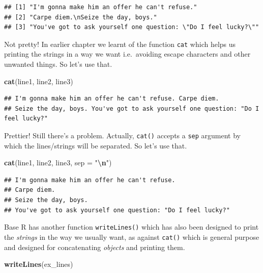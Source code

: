 \documentclass[
]{book}
\newenvironment{Shaded}{\begin{snugshade}}{\end{snugshade}}
\newcommand{\AttributeTok}[1]{\textcolor[rgb]{0.13,0.29,0.53}{#1}}
\newcommand{\FunctionTok}[1]{\textcolor[rgb]{0.13,0.29,0.53}{\textbf{#1}}}
\newcommand{\NormalTok}[1]{#1}
\newcommand{\SpecialCharTok}[1]{\textcolor[rgb]{0.81,0.36,0.00}{\textbf{#1}}}
\newcommand{\StringTok}[1]{\textcolor[rgb]{0.31,0.60,0.02}{#1}}
\begin{document}
\begin{verbatim}
## [1] "I'm gonna make him an offer he can't refuse."                 
## [2] "Carpe diem.\nSeize the day, boys."                            
## [3] "You've got to ask yourself one question: \"Do I feel lucky?\""
\end{verbatim}

Not pretty! In earlier chapter we learnt of the function \texttt{cat} which helps us printing the strings in a way we want i.e.~avoiding escape characters and other unwanted things. So let's use that.

\begin{Shaded}
\begin{Highlighting}[]
\FunctionTok{cat}\NormalTok{(line1, line2, line3)}
\end{Highlighting}
\end{Shaded}

\begin{verbatim}
## I'm gonna make him an offer he can't refuse. Carpe diem.
## Seize the day, boys. You've got to ask yourself one question: "Do I feel lucky?"
\end{verbatim}

Prettier! Still there's a problem. Actually, \texttt{cat()} accepts a \texttt{sep} argument by which the lines/strings will be separated. So let's use that.

\begin{Shaded}
\begin{Highlighting}[]
\FunctionTok{cat}\NormalTok{(line1, line2, line3, }\AttributeTok{sep =} \StringTok{"}\SpecialCharTok{\textbackslash{}n}\StringTok{"}\NormalTok{)}
\end{Highlighting}
\end{Shaded}

\begin{verbatim}
## I'm gonna make him an offer he can't refuse.
## Carpe diem.
## Seize the day, boys.
## You've got to ask yourself one question: "Do I feel lucky?"
\end{verbatim}

Base R has another function \texttt{writeLines()} which has also been designed to print the \emph{strings} in the way we usually want, as against \texttt{cat()} which is general purpose and designed for concatenating \emph{objects} and printing them.

\begin{Shaded}
\begin{Highlighting}[]
\FunctionTok{writeLines}\NormalTok{(ex\_lines)}
\end{Highlighting}
\end{Shaded}
\end{document}
